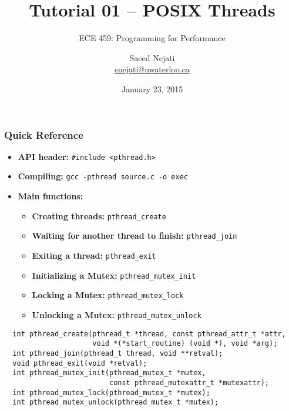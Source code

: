 \documentclass[aspectratio=43,11pt]{beamer}
\title{Tutorial 01 -- POSIX Threads}
\subtitle{ECE 459: Programming for Performance}
\author{Saeed Nejati \\ \href{mailto:snejati@uwaterloo.ca}{snejati@uwaterloo.ca}}
\institute{University of Waterloo}
\date{January 23, 2015}
\begin{document}
\begin{frame}[plain]
  \titlepage
\end{frame}

\begin{frame}[fragile]
  \frametitle{Quick Reference}
  
  \begin{itemize}
    \item \textbf{API header:} {\tt \#include <pthread.h>}
    \item \textbf{Compiling:} {\tt gcc -pthread source.c -o exec}
    \item \textbf{Main functions:}
    \begin{itemize}
      \item \textbf{Creating threads:} {\tt pthread\_create}
      \item \textbf{Waiting for another thread to finish:} {\tt pthread\_join}
      \item \textbf{Exiting a thread:} {\tt pthread\_exit}
      \item \textbf{Initializing a Mutex: } {\tt pthread\_mutex\_init}
      \item \textbf{Locking a Mutex:} {\tt pthread\_mutex\_lock}
      \item \textbf{Unlocking a Mutex:} {\tt pthread\_mutex\_unlock}
    \end{itemize}
  \end{itemize}
  \begin{lstlisting}
  int pthread_create(pthread_t *thread, const pthread_attr_t *attr,
                     void *(*start_routine) (void *), void *arg);
  int pthread_join(pthread_t thread, void **retval);
  void pthread_exit(void *retval);
  int pthread_mutex_init(pthread_mutex_t *mutex,
                         const pthread_mutexattr_t *mutexattr);
  int pthread_mutex_lock(pthread_mutex_t *mutex);
  int pthread_mutex_unlock(pthread_mutex_t *mutex);
  \end{lstlisting}
\end{frame}
\end{document}
